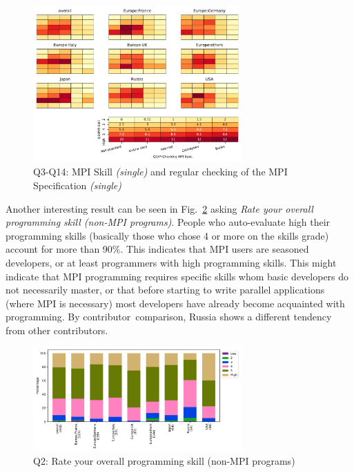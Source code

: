\documentclass[preprint,5p,times]{elsarticle}
\def\myquote#1{{\it #1}}
\def\country{contributor\xspace{}}%
\def\countries{contributors\xspace{}}%
\begin{document}
\begin{figure}[htb]
\begin{center}
\includegraphics[width=8.0cm]{Figs/Q3-Q14.pdf}
\caption{Q3-Q14: MPI Skill {\it(single)} and regular checking of the MPI Specification {\it(single)}}
\label{fig:reading-standard-and-checking-spec}
\end{center}
\end{figure}

Another interesting result can be seen in Fig.~\ref{fig:prog-skill} asking
\myquote{Rate your overall programming skill (non-MPI programs)}. People who
auto-evaluate  high their programming skills (basically those who chose 4 or
more on the skills grade) account for more than 90\%. This indicates that MPI
users are seasoned developers, or at least programmers with high programming
skills. This might indicate that MPI programming requires specific skills whom
basic developers do not necessarily master, or that before starting to write
parallel applications (where MPI is necessary) most developers have already
become acquainted with programming. By \country\ comparison, Russia shows a
different tendency from other \countries.

\begin{figure}[htb]
\begin{center}
\includegraphics[width=8.0cm]{Figs/Q2.pdf}
\caption{Q2: Rate your overall programming skill (non-MPI
  programs)}
\label{fig:prog-skill}
\end{center}
\end{figure}
\end{document}
